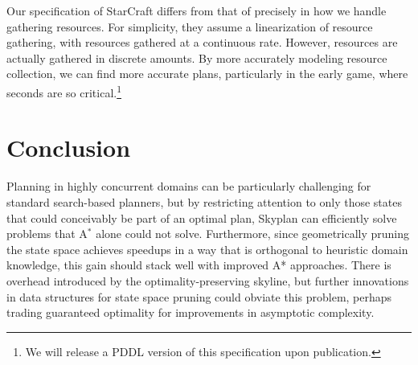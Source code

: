 \documentclass[letterpaper]{article}
\theoremstyle{plain} \newtheorem{theorem}{Theorem} \newtheorem{proposition}{Proposition} \newtheorem{lemma}{Lemma}
\theoremstyle{definition} \newtheorem{definition}{Definition} \newtheorem{conjecture}{Conjecture} \newtheorem*{example}{Example}
\theoremstyle{remark} \newtheorem*{remark}{Remark} \newtheorem*{note}{Note} \newtheorem{case}{Case}
\newcommand{\Astar}{A$^*$ }
\begin{document}
Our specification of StarCraft differs from that of
\citet{churchill11build} precisely in how we handle gathering
resources. For simplicity, they assume a linearization of resource
gathering, with resources gathered at a continuous rate. However,
resources are actually gathered in discrete amounts. By more
accurately modeling resource collection, we can find more
accurate plans, particularly in the early game, where seconds
are so critical.\footnote{We will release a PDDL version
of this specification upon publication.}

\section{Conclusion}

Planning in highly concurrent domains can be particularly challenging for standard
search-based planners, but by restricting attention to only those states that could
conceivably be part of an optimal plan, Skyplan can efficiently solve problems that
\Astar alone could not solve. Furthermore, since
geometrically pruning the state space achieves speedups in a way that is orthogonal to
heuristic domain knowledge, this gain should stack well with improved A* approaches. There
is overhead introduced by the optimality-preserving skyline, but further innovations in
data structures for state space pruning could obviate this problem, perhaps trading
guaranteed optimality for improvements in asymptotic complexity.



\end{document}
